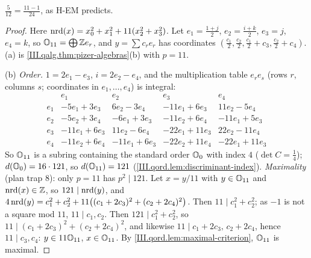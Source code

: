 \begin{example}[Pizer's order for $D=11$]
\end{example}
\noindent $\frac5{12}=\frac{11-1}{24}$, as H-EM predicts.
\begin{proof}
Here $\operatorname{nrd}(x)=x_0^2+x_1^2+11(x_2^2+x_3^2)$. Let $e_1=\frac{1+j}2$, $e_2=\frac{i+k}2$, $e_3=j$, $e_4=k$, so $\mathbb{O}_{11}=\bigoplus\mathbb{Z} e_r$, and
$y=\sum c_re_r$ has coordinates $(\frac{c_1}2,\frac{c_2}2,\frac{c_1}2+c_3,\frac{c_2}2+c_4)$.
(a) is \cref{III.qalg.thm:pizer-algebras}(b) with $p=11$.

(b) \emph{Order.} $1=2e_1-e_3$, $i=2e_2-e_4$, and the multiplication table $e_re_s$ (rows $r$, columns $s$; coordinates in $e_1,\dots,e_4$) is integral:
\[
\begin{array}{c|cccc}
 &e_1&e_2&e_3&e_4\\\hline
e_1&-5e_1+3e_3&6e_2-3e_4&-11e_1+6e_3&11e_2-5e_4\\
e_2&-5e_2+3e_4&-6e_1+3e_3&-11e_2+6e_4&-11e_1+5e_3\\
e_3&-11e_1+6e_3&11e_2-6e_4&-22e_1+11e_3&22e_2-11e_4\\
e_4&-11e_2+6e_4&-11e_1+6e_3&-22e_2+11e_4&-22e_1+11e_3
\end{array}
\]
So $\mathbb{O}_{11}$ is a subring containing the standard order $\mathbb{O}_0$ with index $4$ ($\det C=\frac14$); $d(\mathbb{O}_0)=16\cdot121$, so $d(\mathbb{O}_{11})=121$
(\cref{III.qord.lem:discriminant-index}). \emph{Maximality} (plan trap 8): only $p=11$ has $p^2\mid121$. Let $x=y/11$ with $y\in\mathbb{O}_{11}$ and
$\operatorname{nrd}(x)\in\mathbb{Z}$, so $121\mid\operatorname{nrd}(y)$, and $4\operatorname{nrd}(y)=c_1^2+c_2^2+11\bigl((c_1+2c_3)^2+(c_2+2c_4)^2\bigr)$. Then $11\mid c_1^2+c_2^2$; as $-1$ is not a square
mod $11$, $11\mid c_1,c_2$. Then $121\mid c_1^2+c_2^2$, so $11\mid(c_1+2c_3)^2+(c_2+2c_4)^2$, and likewise $11\mid c_1+2c_3,\,c_2+2c_4$, hence $11\mid c_3,c_4$:
$y\in11\mathbb{O}_{11}$, $x\in\mathbb{O}_{11}$. By \cref{III.qord.lem:maximal-criterion}, $\mathbb{O}_{11}$ is maximal.


\end{proof}
